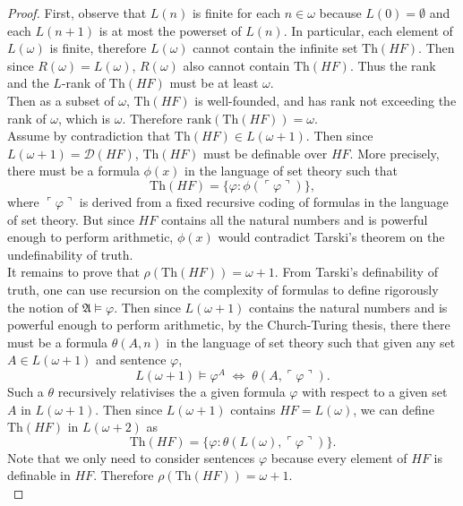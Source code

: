 \documentclass{article}
\begin{document}
  \begin{proof}
    First, observe that $L(n)$ is finite for each $n\in\omega$ because
    $L(0)=\emptyset$ and each $L(n+1)$ is at most the powerset of $L(n)$.
    In particular, each element of $L(\omega)$ is finite, therefore
    $L(\omega)$ cannot contain the infinite set $\text{Th}(HF)$. Then since
    $R(\omega)=L(\omega)$, $R(\omega)$ also cannot contain $\text{Th}(HF)$.
    Thus the rank and the $L$-rank of $\text{Th}(HF)$ must be at least
    $\omega$. \\

    Then as a subset of $\omega$, $\text{Th}(HF)$ is well-founded, and has
    rank not exceeding the rank of $\omega$, which is $\omega$. Therefore
    $\text{rank}(\text{Th}(HF)) =\omega$. \\

    Assume by contradiction that $\text{Th}(HF) \in L(\omega+1)$. Then
    since $L(\omega+1) =\mathcal{D}(HF)$, $\text{Th}(HF)$ must be definable
    over $HF$. More precisely, there must be a formula $\phi(x)$ in the
    language of set theory such that
    \[\text{Th}(HF) =\{\varphi: \phi(\ulcorner\varphi\urcorner)\},\]
    where $\ulcorner\varphi\urcorner$ is derived from a fixed recursive
    coding of formulas in the language of set theory. But since $HF$
    contains all the natural numbers and is powerful enough to perform
    arithmetic, $\phi(x)$ would contradict Tarski's theorem on the
    undefinability of truth. \\ 

    It remains to prove that $\rho(\text{Th}(HF)) =\omega+1$. From Tarski's
    definability of truth, one can use recursion on the complexity of
    formulas to define rigorously the notion of $\mathfrak{A}
    \models\varphi$. Then since $L(\omega+1)$ contains the natural numbers
    and is powerful enough to perform arithmetic, by the Church-Turing
    thesis, there there must be a formula $\theta(A,n)$ in the language of
    set theory such that given any set $A\in L(\omega+1)$ and sentence
    $\varphi$,
    \[L(\omega+1) \models \varphi^A\; \Leftrightarrow\;
    \theta(A,\ulcorner\varphi\urcorner).\]
    Such a $\theta$ recursively relativises the a given formula $\varphi$
    with respect to a given set $A$ in $L(\omega+1)$. Then since
    $L(\omega+1)$ contains $HF=L(\omega)$, we can define $\text{Th}(HF)$ in
    $L(\omega+2)$ as
    \[\text{Th}(HF) =\{\varphi:
    \theta(L(\omega),\ulcorner\varphi\urcorner)\}.\]
    Note that we only need to consider sentences $\varphi$ because every
    element of $HF$ is definable in $HF$. Therefore $\rho(\text{Th}(HF))
    =\omega+1$. \\


\end{proof}
\end{document}
